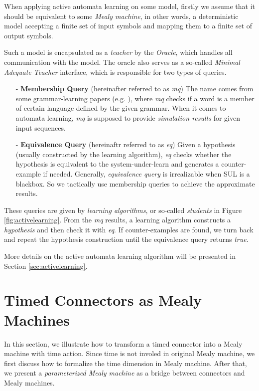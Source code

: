 \documentclass[conference, a4paper]{IEEEtran}
\begin{document}
When applying active automata learning on some model, firstly we assume that it should be equivalent
to some \emph{Mealy machine}, in other words, a deterministic model accepting a finite set of input
symbols and mapping them to a finite set of output symbols.

Such a model is encapsulated as a \emph{teacher} by the \emph{Oracle}, which handles
all communication with the model. The oracle also serves as a so-called \emph{Minimal Adequate Teacher}
interface, which is responsible for two types of queries. 

\begin{itemize}
  \item[-] \textbf{Membership Query} (hereinafter referred to as \emph{mq}) The name comes from
    some grammar-learning papers (e.g. \cite{DBLP:journals/iandc/Angluin87}), where \emph{mq} checks
    if a word is a member of certain language defined by the given grammar. When it comes to
    automata learning, \emph{mq} is supposed to provide \emph{simulation results} for given input
    sequences.
  \item[-] \textbf{Equivalence Query} (hereinaftr referred to as \emph{eq}) Given a hypothesis
    (usually constructed by the learning algorithm), \emph{eq} checks whether the hypothesis is
    equivalent to the system-under-learn and generates a counter-example if needed. Generally, 
    \emph{equivalence query} is irrealizable when SUL is a blackbox. So we tactically use membership
    queries to achieve the approximate results.
\end{itemize}

These queries are given by \emph{learning algorithms}, or so-called \emph{students} in Figure
\ref{fig:activelearning}. From the \emph{mq} results, a learning algorithm constructs a
\emph{hypothesis} and then check it with \emph{eq}. If counter-examples are found, we turn back and
repeat the hypothesis construction until the equivalence query returns \emph{true}.

More details on the active automata learning algorithm will be presented in Section
\ref{sec:activelearning}. 

\section{Timed Connectors as Mealy Machines}
\label{sec:semantics}
In this section, we illustrate how to transform a timed connector into a Mealy machine with time
action.
Since time is not involed in original Mealy machine, we first discuss how to formalize the time
dimension in Mealy machine. After that, we present a \emph{parameterized Mealy
machine} as a bridge between connectors and Mealy machines.
\end{document}
